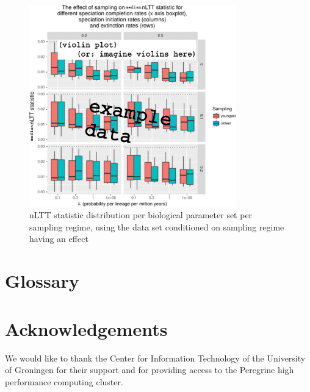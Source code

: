 \documentclass{article}
\begin{document}
\begin{figure}[!htbp]
  \includegraphics[width=0.8\textwidth]{fig_sampling.png}
  \caption{
    nLTT statistic distribution per biological parameter set per sampling
    regime, using the data set conditioned on sampling regime having an effect 
  }
\end{figure}

\section{Glossary}


\section{Acknowledgements}

We would like to thank the Center for Information Technology of the University of Groningen for their support
and for providing access to the Peregrine high performance computing cluster.

\end{document}
